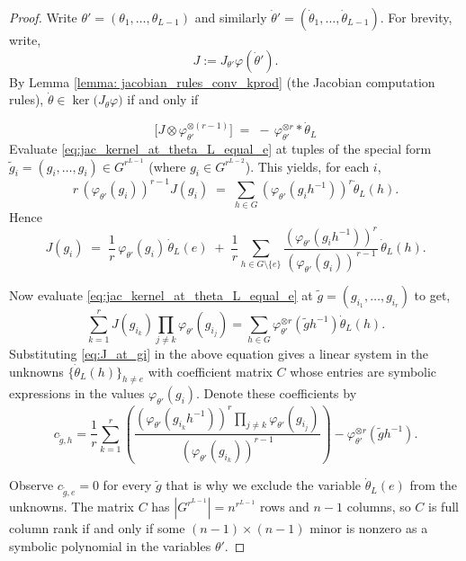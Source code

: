 \documentclass[10pt,a4paper]{amsart}
\newcommand{\conv}{\ast}
\newcommand{\kprod}{\otimes}
\begin{document}
\begin{proof}
Write $\theta'=(\theta_1,\dots,\theta_{L-1})$ and similarly $\dot\theta'=(\dot\theta_1,\dots,\dot\theta_{L-1})$.
For brevity, write,
\[
J := J_{\theta'}\varphi(\dot{\theta}').
\]
By Lemma \ref{lemma: jacobian_rules_conv_kprod} (the Jacobian computation rules),
$\dot\theta\in\ker\bigl(J_{\theta}\varphi\bigr)$ if and only if

\begin{equation}\label{eq:jac_kernel_at_theta_L_equal_e}
\bigl[J\kprod \varphi_{\theta'}^{\otimes (r-1)}\bigr]
\;=\;
-\,\varphi_{\theta'}^{\otimes r}\conv \dot\theta_L
\end{equation}
Evaluate \eqref{eq:jac_kernel_at_theta_L_equal_e} at tuples of the special form $\tilde g_i=(g_i,\dots,g_i)\in G^{r^{L-1}}$
(where $g_i\in G^{r^{L-2}}$). This yields, for each $i$,
\[
r\,(\varphi_{\theta'}(g_i))^{r-1} J(g_i) \;=\; \sum_{h\in G} (\varphi_{\theta'}(g_i h^{-1}))^r \dot\theta_L(h).
\]
Hence
\begin{equation}\label{eq:J_at_gi}
J(g_i)
\;=\;
\frac{1}{r}\,\varphi_{\theta'}(g_i)\,\dot\theta_L(e)
\;+\;
\frac{1}{r}\sum_{h\in G\setminus\{e\}}
\frac{(\varphi_{\theta'}(g_i   h^{-1}))^r}{(\varphi_{\theta'}(g_i))^{\,{r-1}}}\,\dot\theta_L(h).
\end{equation}

Now evaluate \eqref{eq:jac_kernel_at_theta_L_equal_e} at $\tilde g=(g_{i_1},\dots,g_{i_r})$ to get,
\[
\sum_{k=1}^r J(g_{i_k}) \prod_{j\neq k} \varphi_{\theta'}(g_{i_j}) = \sum_{h\in G}\varphi_{\theta'}^{\otimes r}(\tilde{g}   h^{-1})\dot{\theta}_L(h).
\]
Substituting \eqref{eq:J_at_gi} in the above equation gives a linear system in the unknowns $\{\dot\theta_L(h)\}_{h\neq e}$ with coefficient matrix $C$ whose entries are symbolic expressions in the values $\varphi_{\theta'}(g_i)$. Denote these coefficients by 
\[
c_{\tilde{g}, h} = \dfrac{1}{r} \sum_{k=1}^r \left(\dfrac{(\varphi_{\theta'}(g_{i_k}   h^{-1}))^r\prod_{j\neq k}\varphi_{\theta'}(g_{i_j})}{(\varphi_{\theta'}(g_{i_k}))^{r-1}}\right) - \varphi_{\theta'}^{\otimes r}(\tilde{g} h^{-1}).
\]

Observe $c_{\tilde g,e}=0$ for every $\tilde g$ that is why we exclude the variable $\dot{\theta}_L(e)$ from the unknowns. The matrix $C$ has $|G^{r^{L-1}}|=n^{r^{L-1}}$ rows and $n-1$ columns, so $C$ is full column rank if and only if some $(n-1)\times(n-1)$ minor is nonzero as a symbolic polynomial in the variables $\theta'$.


\end{proof}
\end{document}
